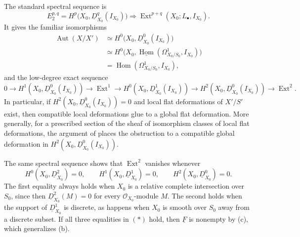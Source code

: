 The standard spectral sequence is
\[
E_2^{p,q}
=H^p\bigl(X_0,\underline D^q_{X_0}(I_{X_0})\bigr)
\Longrightarrow
\operatorname{Ext}^{p+q}(X_0;L_\bullet,I_{X_0}).
\]
It gives the familiar isomorphisms
\begin{align*}
\operatorname{Aut}(X/X')
&\simeq H^0\bigl(X_0,\underline D^0_{X_0}(I_{X_0})\bigr)\\
&\simeq H^0\bigl(X_0,
  \underline{\operatorname{Hom}}
  (\Omega^1_{X_0/S_0},I_{X_0})\bigr)\\
&=\operatorname{Hom}(\Omega^1_{X_0/S_0},I_{X_0}),
\end{align*}
and the low-degree exact sequence
\[
0\longrightarrow H^1(X_0,\underline D^0_{X_0}(I_{X_0}))
\longrightarrow\operatorname{Ext}^1
\longrightarrow H^0(X_0,\underline D^1_{X_0}(I_{X_0}))
\longrightarrow H^2(X_0,\underline D^0_{X_0}(I_{X_0}))
\longrightarrow\operatorname{Ext}^2.
\]
In particular, if
$H^2(X_0,\underline D^0_{X_0}(I_{X_0}))=0$ and local flat
deformations of $X'/S'$ exist, then compatible local deformations
glue to a global flat deformation. More generally, for a prescribed
section of the sheaf of isomorphism classes of local flat
deformations, the argument of  places the obstruction to a
compatible global deformation in
$H^2(X_0,\underline D^0_{X_0}(I_{X_0}))$.


The same spectral sequence shows that $\operatorname{Ext}^2$ vanishes
whenever
\begin{equation}\tag{*}
H^0(X_0,\underline D^2_{X_0})=0,
\qquad
H^1(X_0,\underline D^1_{X_0})=0,
\qquad
H^2(X_0,\underline D^0_{X_0})=0.
\end{equation}
The first equality always holds when $X_0$ is a relative complete
intersection over $S_0$, since then
$\underline D^2_{X_0}(M)=0$ for every $\mathcal O_{X_0}$-module $M$.
The second holds when the support of $\underline D^1_{X_0}$ is
discrete, as happens when $X_0$ is smooth over $S_0$ away from a
discrete subset. If all three equalities in $(*)$ hold, then
$\underline F$ is nonempty by (c), which generalizes (b).

